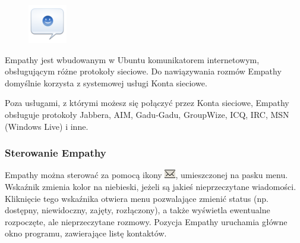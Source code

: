\begin{figure}
	\vspace{-10pt}
	\includegraphics[width=\linewidth]{images/ikony_empathy.png}
\end{figure}

\textcolor{ubuntu_orange}{Empathy} jest wbudowanym w Ubuntu komunikatorem internetowym, obsługującym różne protokoły sieciowe. Do nawiązywania rozmów Empathy domyślnie korzysta z systemowej usługi \textcolor{ubuntu_orange}{Konta sieciowe}.

Poza usługami, z którymi możesz się połączyć przez Konta sieciowe, Empathy obsługuje protokoły Jabbera, AIM, Gadu-Gadu, GroupWize, ICQ, IRC, MSN (Windows Live) i inne.

\subsubsection{Sterowanie Empathy}
Empathy można sterować za pomocą ikony \includegraphics{images/unity_wskaznik_wiadomosci.png}, umieszczonej na pasku menu. Wskaźnik zmienia kolor na niebieski, jeżeli są jakieś nieprzeczytane wiadomości. Kliknięcie tego wskaźnika otwiera menu pozwalające zmienić status (np. dostępny, niewidoczny, zajęty, rozłączony), a także wyświetla ewentualne rozpoczęte, ale nieprzeczytane rozmowy. Pozycja \textcolor{ubuntu_orange}{Empathy} uruchamia główne okno programu, zawierające listę kontaktów.

